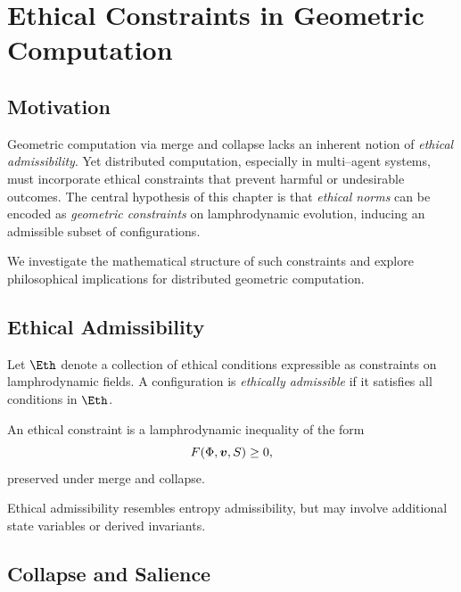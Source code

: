 
\chapter{Ethical Constraints in Geometric Computation}
\label{chap:ethical-constraints}

\section{Motivation}

Geometric computation via merge and collapse lacks an inherent notion of
\emph{ethical admissibility}. Yet distributed computation, especially in
multi--agent systems, must incorporate ethical constraints that prevent
harmful or undesirable outcomes. The central hypothesis of this chapter
is that \emph{ethical norms} can be encoded as \emph{geometric
constraints} on lamphrodynamic evolution, inducing an admissible subset
of configurations.

We investigate the mathematical structure of such constraints and
explore philosophical implications for distributed geometric
computation.


\section{Ethical Admissibility}

Let $\Eth$ denote a collection of ethical conditions expressible as
constraints on lamphrodynamic fields. A configuration is
\emph{ethically admissible} if it satisfies all conditions in $\Eth$.

\begin{definition}
An ethical constraint is a lamphrodynamic inequality of the form
\[
  F(\Phi,\bm{v},S) \ge 0,
\]
preserved under merge and collapse.
\end{definition}

\begin{remark}
Ethical admissibility resembles entropy admissibility, but may involve
additional state variables or derived invariants.
\end{remark}


\section{Collapse and Salience}

